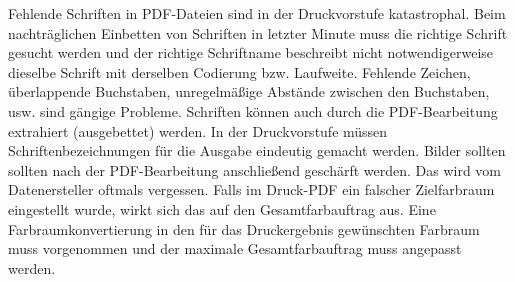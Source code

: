 Fehlende Schriften in PDF-Dateien sind in der Druckvorstufe katastrophal. Beim nachträglichen Einbetten von Schriften in letzter Minute muss die richtige Schrift gesucht werden und der richtige Schriftname beschreibt nicht notwendigerweise dieselbe Schrift mit derselben Codierung bzw. Laufweite. Fehlende Zeichen, überlappende Buchstaben, unregelmäßige Abstände zwischen den Buchstaben, usw. sind gängige Probleme. Schriften können auch durch die PDF-Bearbeitung extrahiert (ausgebettet) werden. In der Druckvorstufe müssen Schriftenbezeichnungen für die Ausgabe eindeutig gemacht werden. Bilder sollten sollten nach der PDF-Bearbeitung anschließend geschärft werden. Das wird vom Datenersteller oftmals vergessen. Falls im Druck-PDF ein falscher Zielfarbraum eingestellt wurde, wirkt sich das auf den Gesamtfarbauftrag aus. Eine Farbraumkonvertierung in den für das Druckergebnis gewünschten Farbraum muss vorgenommen und der maximale Gesamtfarbauftrag muss angepasst werden. 
\cite{schneeberger}

